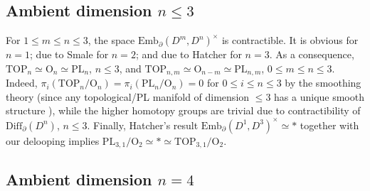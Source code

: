 \documentclass[11pt]{amsart}
\newtheorem{corollary}[theorem]{Corollary}
\theoremstyle{definition}
\newcommand{\Emb}{\mathrm{Emb}}
\newcommand{\Diffn}{\mathrm{Diff}_\partial(D^n)}
\newcommand{\PL}{\mathrm{PL}}
\newcommand{\TOP}{\mathrm{TOP}}
\newcommand{\OO}{\mathrm{O}}
\numberwithin{equation}{section}
\begin{document}
%
%

\subsection{Ambient dimension $n\leq 3$}\label{ss:d3}

For $1\leq m\leq n\leq 3$, the space $\Emb_\partial(D^m,D^n)^{\times}$ is contractible. It is obvious for $n=1$; due to Smale \cite{Smale_diff}
for $n=2$; and due to Hatcher \cite{Hatcher_diff} for $n=3$. As a consequence, $\TOP_n\simeq \OO_n\simeq\PL_n$, $n\leq 3$, 
and $\TOP_{n,m}\simeq\OO_{n-m}\simeq
\PL_{n,m}$, $0\leq m\leq n\leq 3$. Indeed, $\pi_i(\TOP_n/\OO_n)=\pi_i(\PL_n/\OO_n)=0$ for $0\leq i\leq n\leq 3$ by the smoothing theory (since any topological/PL manifold of dimension $\leq 3$ has a unique smooth structure \cite[Essay~5, \S5]{KS_essays}), while the higher homotopy groups are trivial due to contractibility
of $\Diffn$, $n\leq 3$. Finally, Hatcher's result  $\Emb_\partial(D^1,D^3)^{\times}\simeq *$ \cite[Appendix]{Hatcher_diff} together with our delooping implies
$\PL_{3,1}/\OO_2\simeq *\simeq \TOP_{3,1}/\OO_2$.



\subsection{Ambient dimension $n=4$}\label{ss:d4}
\end{document}
